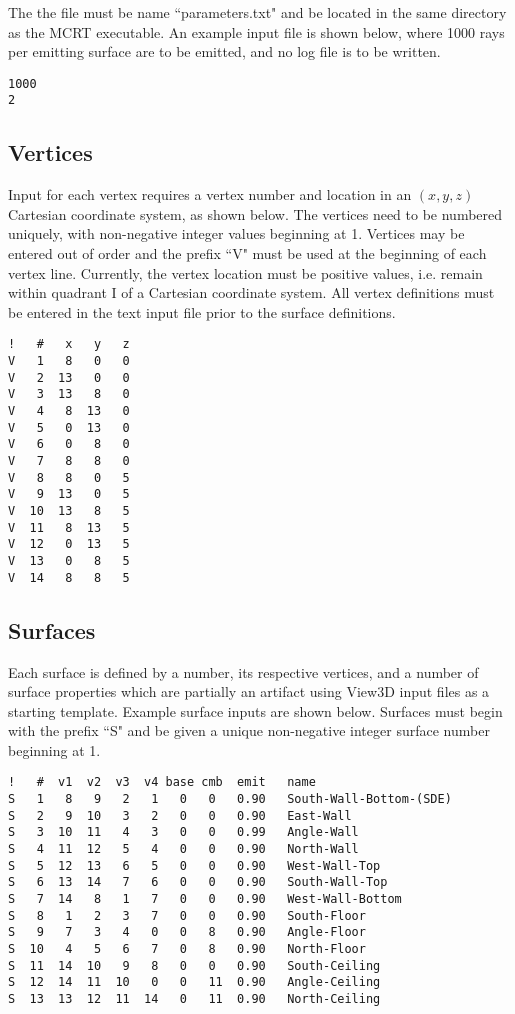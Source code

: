 \documentclass{article}
\begin{document}
The the file must be name ``parameters.txt" and be located in the same directory as the MCRT executable. An example input file is shown below, where 1000 rays per emitting surface are to be emitted, and no log file is to be written.

\begin{lstlisting}
1000
2
\end{lstlisting}

\subsection{Vertices}
\label{subsec:verts}

Input for each vertex requires a vertex number and location in an $(x,y,z)$ Cartesian coordinate system, as shown below. The vertices need to be numbered uniquely, with non-negative integer values beginning at 1. Vertices may be entered out of order and the prefix ``V" must be used at the beginning of each vertex line. Currently, the vertex location must be positive values, i.e. remain within quadrant I of a Cartesian coordinate system. All vertex definitions must be entered in the text input file prior to the surface definitions.

\begin{lstlisting}
!   #   x   y   z
V   1   8   0   0
V   2  13   0   0
V   3  13   8   0
V   4   8  13   0
V   5   0  13   0
V   6   0   8   0
V   7   8   8   0
V   8   8   0   5
V   9  13   0   5
V  10  13   8   5
V  11   8  13   5
V  12   0  13   5
V  13   0   8   5
V  14   8   8   5
\end{lstlisting}

\subsection{Surfaces}
\label{subsec:surfs}
Each surface is defined by a number, its respective vertices, and a number of surface properties which are partially an artifact using View3D input files as a starting template. Example surface inputs are shown below. Surfaces must begin with the prefix ``S" and be given a unique non-negative integer surface number beginning at 1.

\begin{lstlisting}
!   #  v1  v2  v3  v4 base cmb  emit   name
S   1   8   9   2   1   0   0   0.90   South-Wall-Bottom-(SDE)
S   2   9  10   3   2   0   0   0.90   East-Wall
S   3  10  11   4   3   0   0   0.99   Angle-Wall
S   4  11  12   5   4   0   0   0.90   North-Wall
S   5  12  13   6   5   0   0   0.90   West-Wall-Top
S   6  13  14   7   6   0   0   0.90   South-Wall-Top
S   7  14   8   1   7   0   0   0.90   West-Wall-Bottom
S   8   1   2   3   7   0   0   0.90   South-Floor
S   9   7   3   4   0   0   8   0.90   Angle-Floor
S  10   4   5   6   7   0   8   0.90   North-Floor
S  11  14  10   9   8   0   0   0.90   South-Ceiling
S  12  14  11  10   0   0   11  0.90   Angle-Ceiling
S  13  13  12  11  14   0   11  0.90   North-Ceiling
\end{lstlisting}
\end{document}
